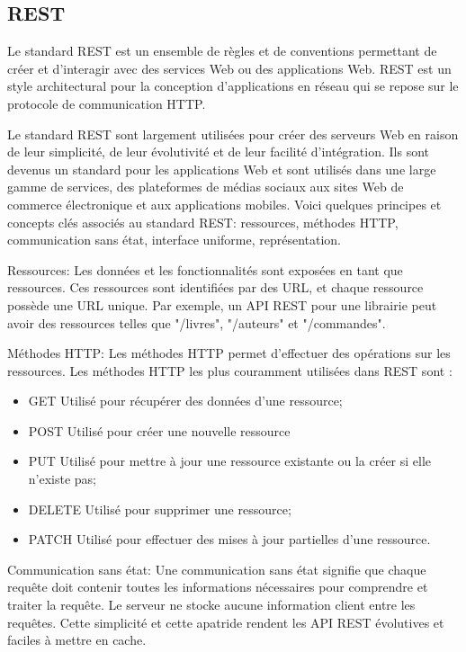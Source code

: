 \subsection{REST}

Le standard REST est un ensemble de règles et de conventions permettant de créer et d'interagir avec des services Web ou des applications Web. REST est un style architectural pour la conception d'applications en réseau qui se repose sur le protocole de communication HTTP.

Le standard REST sont largement utilisées pour créer des serveurs Web en raison de leur simplicité, de leur évolutivité et de leur facilité d'intégration. Ils sont devenus un standard pour les applications Web et sont utilisés dans une large gamme de services, des plateformes de médias sociaux aux sites Web de commerce électronique et aux applications mobiles. Voici quelques principes et concepts clés associés au standard REST: ressources, méthodes HTTP, communication sans état, interface uniforme, représentation.

Ressources: Les données et les fonctionnalités sont exposées en tant que ressources. Ces ressources sont identifiées par des URL, et chaque ressource possède une URL unique. Par exemple, un API REST pour une librairie peut avoir des ressources telles que "/livres", "/auteurs" et "/commandes".

Méthodes HTTP: Les méthodes HTTP permet d'effectuer des opérations sur les ressources. Les méthodes HTTP les plus couramment utilisées dans REST sont :
\begin{itemize}
    \item GET Utilisé pour récupérer des données d'une ressource;
    \item POST Utilisé pour créer une nouvelle ressource
    \item PUT Utilisé pour mettre à jour une ressource existante ou la créer si elle n'existe pas;
    \item DELETE Utilisé pour supprimer une ressource;
    \item PATCH Utilisé pour effectuer des mises à jour partielles d'une ressource.
\end{itemize}


Communication sans état: Une communication sans état signifie que chaque requête doit contenir toutes les informations nécessaires pour comprendre et traiter la requête. Le serveur ne stocke aucune information client entre les requêtes. Cette simplicité et cette apatride rendent les API REST évolutives et faciles à mettre en cache.

